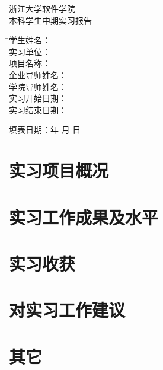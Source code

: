 \newpage
\thispagestyle{empty}

\vspace{4cm}

\begin{center}
\songti\xiaoyi 浙江大学软件学院  \\
\songti\xiaoyi 本科学生中期实习报告
\end{center}

\vspace{4cm}

\begin{tabbing}
              \= \songti\sihao 学生姓名：\quad \quad \= \underline{\makebox[6cm]{}} \\[2mm]
               \> \songti\sihao 实习单位：\> \underline{\makebox[6cm]{\sihao\zjumentorc}} \\[2mm]
               \> \songti\sihao 项目名称：\> \underline{\makebox[6cm]{\sihao\zjugrade\hspace{3mm}\zjumajor}} \\[2mm]
              \> \songti\sihao 企业导师姓名： \>
              \underline{\makebox[6cm]{}} \\[2mm]
              \> \songti\sihao 学院导师姓名：  \>
              \underline{\makebox[6cm]{}} \\[2mm]
              \> \songti\sihao 实习开始日期： \>
              \underline{\makebox[6cm]{}} \\[2mm]
              \> \songti\sihao 实习结束日期： \>
              \underline{\makebox[6cm]{}}
\end{tabbing}

\vspace{1cm}
\begin{center}
\songti\xiaosan 填表日期：\quad 年 \quad 月 \quad 日
\end{center}
  
\chapter{实习项目概况}
\chapter{实习工作成果及水平}
\chapter{实习收获}
\chapter{对实习工作建议}
\chapter{其它}
